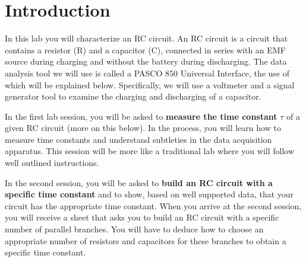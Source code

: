 \documentclass[12pt]{report}
\begin{document}
\section{Introduction}
In this lab you will characterize an RC circuit. An RC circuit is a circuit that contains a resistor (R) and a capacitor (C), connected in series with an EMF source during charging and without the battery during discharging.  
The data analysis tool we will use is called a PASCO 850 Universal Interface, the use of which will be explained below. 
Specifically, we will  use a voltmeter and a 
signal generator tool to examine the charging and discharging of a capacitor. 

In the first lab session, you will be asked to \textbf{measure the time constant} $\tau$ of a given RC circuit (more on tbis below). 
In the process, you will learn how to measure time constants and understand subtleties in the data acquisition apparatus. 
This session will be more like a traditional lab where you will follow well outlined instructions. 

In the second session, you will be asked to \textbf{build an RC circuit with a specific time constant} and to show, based on well supported data, that your circuit has the appropriate time constant. 
When you arrive at the second session, you will receive a sheet that asks you to build an RC circuit with a specific number of parallel branches. 
You will have to deduce how to choose an appropriate number of resistors and capacitors for these branches to obtain a specific time constant.
\end{document}
